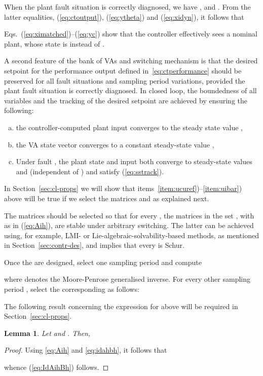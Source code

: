 \documentclass[letterpaper, 10 pt, conference]{ieeeconf}
\newtheorem{lem}{Lemma}
\begin{document}
When the plant fault situation is correctly diagnosed, we have
,  and . From the latter equalities,
(\ref{eq:ctoutput}), (\ref{eq:ytheta}) and (\ref{eq:xidyn}), it
follows that

Eqs.~(\ref{eq:ximatched})--(\ref{eq:yc}) show that the controller
effectively sees a nominal plant, whose state is  instead of
.

A second feature of the bank of VAs and switching mechanism is that
the desired setpoint  for the performance output  defined
in~\eqref{eq:ctperformance} should be preserved for all fault
situations and sampling period variations, provided the plant fault
situation is correctly diagnosed. In closed loop, the boundedness of
all variables and the tracking of the desired setpoint  are
achieved by ensuring the following:
\begin{enumerate}[a)]
\item the controller-computed plant input  converges to the
  steady state value , \label{item:ucuref}
\item the VA state vector  converges to a constant
  steady-state value , \label{item:xthetass}
\item Under fault , the plant state  and input  both converge to steady-state values  and  (independent of ) and satisfy  (\ref{eq:sstrack}).\label{item:uibar}
\end{enumerate}
In Section~\ref{sec:cl-props} we will show that
items~\ref{item:ucuref})--\ref{item:uibar}) above will be true if we
select the matrices  and  as explained next.

The matrices  should be selected so that for every , the matrices in the set ,
with  as in (\ref{eq:Aih}), are stable under arbitrary
switching. The latter can be achieved using, for example, LMI- or
Lie-algebraic-solvability-based methods, as mentioned in
Section~\ref{sec:contr-des}, and implies that every  is Schur.


Once the  are designed, select one sampling period 
and compute

where  denotes the Moore-Penrose generalised inverse. For
every other sampling period , select the corresponding
 as follows:

The following result concerning the expression for  above will
be required in Section~\ref{sec:cl-props}.
\begin{lem}
  \label{lem:imAihBh}
  Let  and . Then,
  
\end{lem}
\begin{proof}
  Using \eqref{eq:Aih} and \eqref{eq:idahbh}, it follows that

  whence (\ref{eq:IdAihBh}) follows.
\end{proof}
\end{document}
